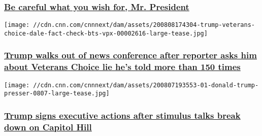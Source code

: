 \hypertarget{be-careful-what-you-wish-for-mr-president}{%
\subsubsection{\texorpdfstring{\href{/2020/08/08/opinions/trump-fourth-debate-request-zelizer/index.html}{Be
careful what you wish for, Mr.
President}}{Be careful what you wish for, Mr. President}}\label{be-careful-what-you-wish-for-mr-president}}

\href{/2020/08/08/politics/trump-veterans-choice-paula-reid/index.html}{}

\texttt{[image: //cdn.cnn.com/cnnnext/dam/assets/200808174304-trump-veterans-choice-dale-fact-check-bts-vpx-00002616-large-tease.jpg]}

\hypertarget{trump-walks-out-of-news-conference-after-reporter-asks-him-about-veterans-choice-lie-hes-told-more-than-150-times-}{%
\subsubsection{\texorpdfstring{\href{/2020/08/08/politics/trump-veterans-choice-paula-reid/index.html}{Trump
walks out of news conference after reporter asks him about Veterans
Choice lie he's told more than 150 times
}}{Trump walks out of news conference after reporter asks him about Veterans Choice lie he's told more than 150 times }}\label{trump-walks-out-of-news-conference-after-reporter-asks-him-about-veterans-choice-lie-hes-told-more-than-150-times-}}

\href{/2020/08/08/politics/trump-executive-order-stimulus/index.html}{}

\texttt{[image: //cdn.cnn.com/cnnnext/dam/assets/200807193553-01-donald-trump-presser-0807-large-tease.jpg]}

\hypertarget{trump-signs-executive-actions-after-stimulus-talks-break-down-on-capitol-hill-}{%
\subsubsection{\texorpdfstring{\href{/2020/08/08/politics/trump-executive-order-stimulus/index.html}{Trump
signs executive actions after stimulus talks break down on Capitol Hill
}}{Trump signs executive actions after stimulus talks break down on Capitol Hill }}\label{trump-signs-executive-actions-after-stimulus-talks-break-down-on-capitol-hill-}}

\href{/2020/08/08/politics/trump-democrats-stimulus-talks-stalled/index.html}{}

